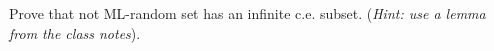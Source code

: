 \begin{problem}
  Prove that not ML-random set has an infinite c.e. subset.
  (\emph{Hint: use a lemma from the class notes}).

  \begin{answer}

  \end{answer}
\end{problem}
